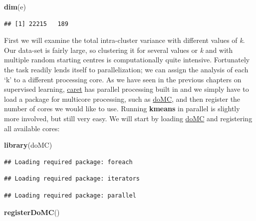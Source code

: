 \documentclass[]{book}
\newenvironment{Shaded}{\begin{snugshade}}{\end{snugshade}}
\newcommand{\KeywordTok}[1]{\textcolor[rgb]{0.13,0.29,0.53}{\textbf{{#1}}}}
\newcommand{\NormalTok}[1]{{#1}}
\theoremstyle{definition}
\theoremstyle{definition}
\theoremstyle{definition}
\theoremstyle{remark}
\begin{document}
\begin{Shaded}
\begin{Highlighting}[]
\KeywordTok{dim}\NormalTok{(e)}
\end{Highlighting}
\end{Shaded}

\begin{verbatim}
## [1] 22215   189
\end{verbatim}

First we will examine the total intra-cluster variance with different
values of \emph{k}. Our data-set is fairly large, so clustering it for
several values or \emph{k} and with multiple random starting centres is
computationally quite intensive. Fortunately the task readily lends
itself to parallelization; we can assign the analysis of each `k' to a
different processing core. As we have seen in the previous chapters on
supervised learning,
\href{http://cran.r-project.org/web/packages/caret/index.html}{caret}
has parallel processing built in and we simply have to load a package
for multicore processing, such as
\href{http://cran.r-project.org/web/packages/doMC/index.html}{doMC}, and
then register the number of cores we would like to use. Running
\textbf{kmeans} in parallel is slightly more involved, but still very
easy. We will start by loading
\href{http://cran.r-project.org/web/packages/doMC/index.html}{doMC} and
registering all available cores:

\begin{Shaded}
\begin{Highlighting}[]
\KeywordTok{library}\NormalTok{(doMC)}
\end{Highlighting}
\end{Shaded}

\begin{verbatim}
## Loading required package: foreach
\end{verbatim}

\begin{verbatim}
## Loading required package: iterators
\end{verbatim}

\begin{verbatim}
## Loading required package: parallel
\end{verbatim}

\begin{Shaded}
\begin{Highlighting}[]
\KeywordTok{registerDoMC}\NormalTok{()}
\end{Highlighting}
\end{Shaded}
\end{document}
